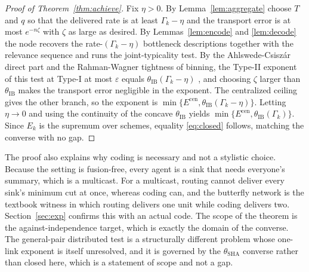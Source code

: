 \documentclass[journal]{IEEEtran}
\theoremstyle{definition}
\theoremstyle{remark}
\newcommand{\Ecen}{E^{\mathrm{cen}}}
\newcommand{\tib}{\theta_{\mathrm{IB}}}
\newcommand{\tsha}{\theta_{\mathrm{SHA}}}
\newcommand{\Gk}{\Gamma_k}
\begin{document}
\begin{proof}[Proof of Theorem~\ref{thm:achieve}]
Fix $\eta>0$. By Lemma~\ref{lem:aggregate} choose $T$ and $q$ so that the delivered rate is at least $\Gk-\eta$
and the transport error is at most $e^{-n\zeta}$ with $\zeta$ as large as desired. By Lemmas~\ref{lem:encode} and
\ref{lem:decode} the node recovers the rate-$(\Gk-\eta)$ bottleneck descriptions together with the relevance
sequence and runs the joint-typicality test. By the Ahlswede-Csisz\'ar direct part and the Rahman-Wagner tightness
of binning, the Type-II exponent of this test at Type-I at most $\varepsilon$ equals $\tib(\Gk-\eta)$
\cite{ahlswedecsiszar1986,rahmanwagner2012}, and choosing $\zeta$ larger than $\tib$ makes the transport error
negligible in the exponent. The centralized ceiling gives the other branch, so the exponent is
$\min\{\Ecen,\tib(\Gk-\eta)\}$. Letting $\eta\to0$ and using the continuity of the concave $\tib$ yields
$\min\{\Ecen,\tib(\Gk)\}$. Since $E_k$ is the supremum over schemes, equality \eqref{eq:closed} follows, matching
the converse with no gap.
\end{proof}

The proof also explains why coding is necessary and not a stylistic choice. Because the setting is fusion-free,
every agent is a sink that needs everyone's summary, which is a multicast. For a multicast, routing cannot deliver
every sink's minimum cut at once, whereas coding can, and the butterfly network is the textbook witness in which
routing delivers one unit while coding delivers two. Section~\ref{sec:exp} confirms this with an actual code. The
scope of the theorem is the against-independence target, which is exactly the domain of the converse. The
general-pair distributed test is a structurally different problem whose one-link exponent is itself unresolved,
and it is governed by the $\tsha$ converse rather than closed here, which is a statement of scope and not a gap.

\end{document}
